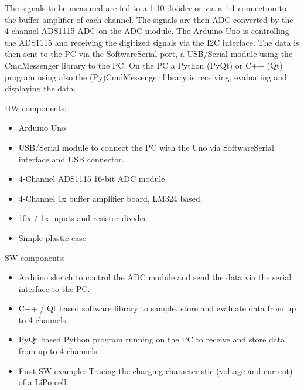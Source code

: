 \documentclass[11pt, oneside]{scrartcl}   	%
\begin{document}
The signals to be measured are fed to a 1:10 divider or via a 1:1 connection to the buffer amplifier of each channel.
The signals are then ADC converted by the 4 channel ADS1115 ADC on the ADC module.
The Arduino Uno is controlling the ADS1115 and receiving the digitized signals via the I2C interface.
The data is then sent to the PC via the SoftwareSerial port, a USB/Serial module using the CmdMessenger library to the PC.
On the PC a Python (PyQt) or C++ (Qt) program using also the (Py)CmdMessenger library is receiving, evaluating and displaying the data.

HW components:
\begin{itemize}
	\item Arduino Uno
	\item USB/Serial module to connect the PC with the Uno via SoftwareSerial interface and USB connector.
	\item 4-Channel ADS1115 16-bit ADC module.
	\item 4-Channel 1x buffer amplifier board, LM324 based.
	\item 10x / 1x inputs and resistor divider.
	\item Simple plastic case
\end{itemize}

SW components:
\begin{itemize}
	\item Arduino sketch to control the ADC module and send the data via the serial interface to the PC.
	\item C++ / Qt based software library to sample, store and evaluate data from up to 4 channels.
	\item PyQt based Python program running on the PC to receive and store data from up to 4 channels.
	\item First SW example: Tracing the charging characteristic (voltage and current) of a LiPo cell.
\end{itemize}
\end{document}
